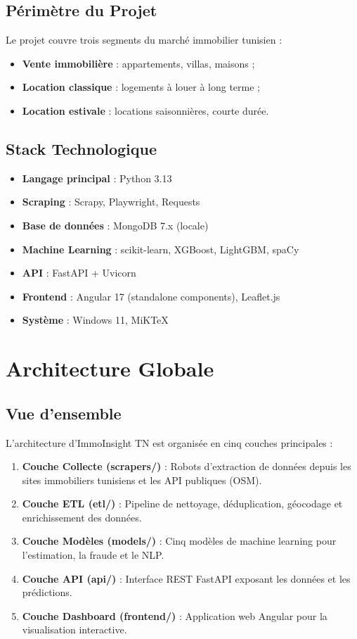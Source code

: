 \documentclass[12pt,a4paper]{report}
\begin{document}
\section{Périmètre du Projet}

Le projet couvre trois segments du marché immobilier tunisien :
\begin{itemize}
    \item \textbf{Vente immobilière} : appartements, villas, maisons ;
    \item \textbf{Location classique} : logements à louer à long terme ;
    \item \textbf{Location estivale} : locations saisonnières, courte durée.
\end{itemize}

\section{Stack Technologique}

\begin{itemize}
    \item \textbf{Langage principal} : Python 3.13
    \item \textbf{Scraping} : Scrapy, Playwright, Requests
    \item \textbf{Base de données} : MongoDB 7.x (locale)
    \item \textbf{Machine Learning} : scikit-learn, XGBoost, LightGBM, spaCy
    \item \textbf{API} : FastAPI + Uvicorn
    \item \textbf{Frontend} : Angular 17 (standalone components), Leaflet.js
    \item \textbf{Système} : Windows 11, MiKTeX
\end{itemize}

\chapter{Architecture Globale}

\section{Vue d'ensemble}

L'architecture d'ImmoInsight TN est organisée en cinq couches principales :

\begin{enumerate}
    \item \textbf{Couche Collecte (scrapers/)} : Robots d'extraction de données depuis les sites immobiliers tunisiens et les API publiques (OSM).
    \item \textbf{Couche ETL (etl/)} : Pipeline de nettoyage, déduplication, géocodage et enrichissement des données.
    \item \textbf{Couche Modèles (models/)} : Cinq modèles de machine learning pour l'estimation, la fraude et le NLP.
    \item \textbf{Couche API (api/)} : Interface REST FastAPI exposant les données et les prédictions.
    \item \textbf{Couche Dashboard (frontend/)} : Application web Angular pour la visualisation interactive.
\end{enumerate}
\end{document}
